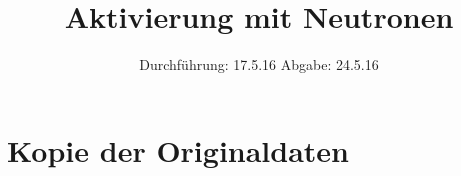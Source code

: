 

\subject{V 702}
\title{Aktivierung mit Neutronen}
\date{
  Durchführung: 17.5.16
  \hspace{3em}
  Abgabe: 24.5.16
}



\maketitle
\thispagestyle{empty}
\tableofcontents
\newpage






\printbibliography

\appendix
\section{Kopie der Originaldaten}


